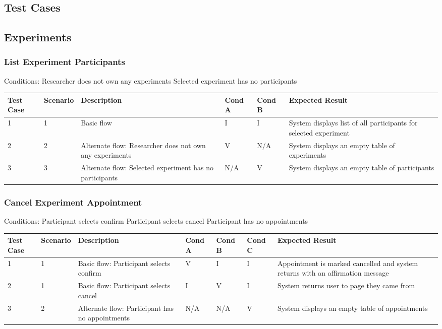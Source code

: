 \begin{landscape}
\section{Test Cases}
\subsection{Experiments}
\subsubsection{List Experiment Participants}
\begin{outline}[enumerate]
\1 [] Conditions:
\2 [A] Researcher does not own any experiments
\2 [B] Selected experiment has no participants
\end{outline}
\begin{table}[!h]
    \begin{tabular}{|l|l|p{3in}|l|l|p{3in}|}
        \hline
        Test Case & Scenario & Description & Cond A & Cond B & Expected Result \\ \hline
        1 & 1 & Basic flow & I & I & System displays list of all participants for selected experiment \\ \hline
        2 & 2 & Alternate flow: Researcher does not own any experiments & V & N/A & System displays an empty table of experiments \\ \hline
        3 & 3 & Alternate flow: Selected experiment has no participants & N/A & V & System displays an empty table of participants \\ \hline
    \end{tabular}
\end{table}

\subsubsection{Cancel Experiment Appointment}
\begin{outline}[enumerate]
\1 [] Conditions:
\2 [A] Participant selects confirm
\2 [B] Participant selects cancel
\2 [C] Participant has no appointments
\end{outline}
\begin{table}[!h]
    \begin{tabular}{|l|l|p{2.75in}|l|l|l|p{2.75in}|}
        \hline
        Test Case & Scenario & Description & Cond A & Cond B & Cond C & Expected Result \\ \hline
        1 & 1 & Basic flow: Participant selects confirm & V & I & I & Appointment is marked cancelled and system returns with an affirmation message \\ \hline
        2 & 1 & Basic flow: Participant selects cancel & I & V & I & System returns user to page they came from \\ \hline
        3 & 2 & Alternate flow: Participant has no appointments & N/A & N/A & V & System displays an empty table of appointments \\ \hline
    \end{tabular}
\end{table}


\end{landscape}
